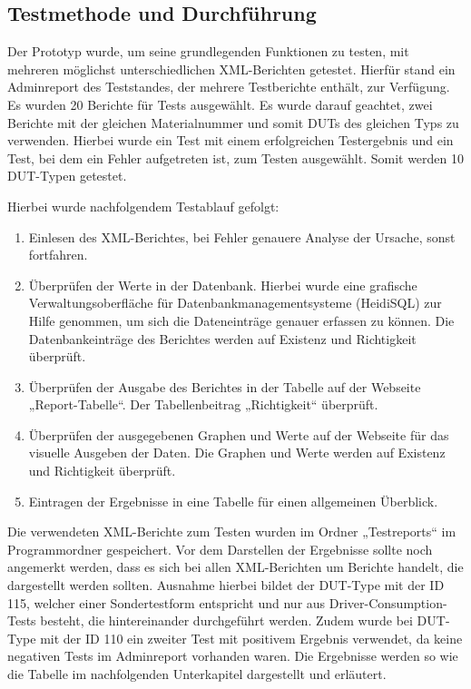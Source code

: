 \subsection{Testmethode und Durchführung}
\label{subsec:testmethoden-und-durchfuhrung}

Der Prototyp wurde, um seine grundlegenden Funktionen zu testen, mit mehreren möglichst unterschiedlichen XML-Berichten getestet.
Hierfür stand ein Adminreport des Teststandes, der mehrere Testberichte enthält, zur Verfügung.
Es wurden 20 Berichte für Tests ausgewählt.
Es wurde darauf geachtet, zwei Berichte mit der gleichen Materialnummer und somit \ac{DUTs} des gleichen Typs zu verwenden.
Hierbei wurde ein Test mit einem erfolgreichen Testergebnis und ein Test, bei dem ein Fehler aufgetreten ist, zum Testen ausgewählt.
Somit werden 10 DUT-Typen getestet.

Hierbei wurde nachfolgendem Testablauf gefolgt:

\begin{enumerate}

    \item Einlesen des XML-Berichtes, bei Fehler genauere Analyse der Ursache, sonst fortfahren.
    \item Überprüfen der Werte in der Datenbank. Hierbei wurde eine grafische Verwaltungsoberfläche für
    Datenbankmanagementsysteme (HeidiSQL) zur Hilfe genommen, um sich die Dateneinträge genauer erfassen zu können.
    Die Datenbankeinträge des Berichtes werden auf Existenz und Richtigkeit überprüft.
    \item Überprüfen der Ausgabe des Berichtes in der Tabelle auf der Webseite „Report-Tabelle“.
    Der Tabellenbeitrag „Richtigkeit“ überprüft.
    \item Überprüfen der ausgegebenen Graphen und Werte auf der Webseite für das visuelle Ausgeben der Daten.
    Die Graphen und Werte werden auf Existenz und Richtigkeit überprüft.
    \item Eintragen der Ergebnisse in eine Tabelle für einen allgemeinen Überblick.

\end{enumerate}

Die verwendeten XML-Berichte zum Testen wurden im Ordner „Testreports“ im Programmordner gespeichert.
Vor dem Darstellen der Ergebnisse sollte noch angemerkt werden, dass es sich bei allen XML-Berichten um Berichte handelt, die dargestellt werden sollten.
Ausnahme hierbei bildet der DUT-Type mit der ID 115, welcher einer Sondertestform entspricht und nur aus Driver-Consumption-Tests besteht, die hintereinander durchgeführt werden.
Zudem wurde bei DUT-Type mit der ID 110 ein zweiter Test mit positivem Ergebnis verwendet, da keine negativen Tests im Adminreport vorhanden waren.
Die Ergebnisse werden so wie die Tabelle im nachfolgenden Unterkapitel dargestellt und erläutert.






